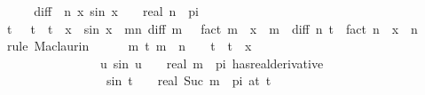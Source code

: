 \begin{isabellebody}
%
\isadelimproof
%
\endisadelimproof
%
\isatagproof
{}\isamarkupfalse%
\ {\isacharminus}{\kern0pt}\isanewline
\ \ \isamarkupfalse%
\ {\isacharquery}{\kern0pt}diff\ {\isacharequal}{\kern0pt}\ {\isachardoublequoteopen}{\isasymlambda}n\ x{\isachardot}{\kern0pt}\ sin\ {\isacharparenleft}{\kern0pt}x\ {\isacharplus}{\kern0pt}\ {}{\isacharslash}{\kern0pt}{}\ {\isacharasterisk}{\kern0pt}\ real\ n\ {\isacharasterisk}{\kern0pt}\ pi{\isacharparenright}{\kern0pt}{\isachardoublequoteclose}\isanewline
\ \ \isamarkupfalse%
\ {\isachardoublequoteopen}{\isasymexists}t{\isachardot}{\kern0pt}\ {}\ {\isacharless}{\kern0pt}\ t\ {\isasymand}\ t\ {\isacharless}{\kern0pt}\ x\ {\isasymand}\ sin\ x\ {\isacharequal}{\kern0pt}\ {\isacharparenleft}{\kern0pt}{\isasymSum}m{\isacharless}{\kern0pt}n{\isachardot}{\kern0pt}\ {\isacharquery}{\kern0pt}diff\ m\ {}\ {\isacharslash}{\kern0pt}\ {\isacharparenleft}{\kern0pt}fact\ m{\isacharparenright}{\kern0pt}\ {\isacharasterisk}{\kern0pt}\ x\ {\isacharcircum}{\kern0pt}\ m{\isacharparenright}{\kern0pt}\ {\isacharplus}{\kern0pt}\ {\isacharquery}{\kern0pt}diff\ n\ t\ {\isacharslash}{\kern0pt}\ fact\ n\ {\isacharasterisk}{\kern0pt}\ x\ {\isacharcircum}{\kern0pt}\ n{\isachardoublequoteclose}\isanewline
\ \ \isamarkupfalse%
\ {\isacharparenleft}{\kern0pt}rule\ Maclaurin{\isacharparenright}{\kern0pt}\isanewline
\ \ \ \ \isamarkupfalse%
\ {\isachardoublequoteopen}{\isasymforall}m\ t{\isachardot}{\kern0pt}\ m\ {\isacharless}{\kern0pt}\ n\ {\isasymand}\ {}\ {\isasymle}\ t\ {\isasymand}\ t\ {\isasymle}\ x\ {\isasymlongrightarrow}\isanewline
\ \ \ \ \ \ \ \ \ \ \ \ \ \ \ \ {\isacharparenleft}{\kern0pt}{\isacharparenleft}{\kern0pt}{\isasymlambda}u{\isachardot}{\kern0pt}\ sin\ {\isacharparenleft}{\kern0pt}u\ {\isacharplus}{\kern0pt}\ {}{\isacharslash}{\kern0pt}{}\ {\isacharasterisk}{\kern0pt}\ real\ m\ {\isacharasterisk}{\kern0pt}\ pi{\isacharparenright}{\kern0pt}{\isacharparenright}{\kern0pt}\ has{\isacharunderscore}{\kern0pt}real{\isacharunderscore}{\kern0pt}derivative\isanewline
\ \ \ \ \ \ \ \ \ \ \ \ \ \ \ \ \ sin\ {\isacharparenleft}{\kern0pt}t\ {\isacharplus}{\kern0pt}\ {}{\isacharslash}{\kern0pt}{}\ {\isacharasterisk}{\kern0pt}\ real\ {\isacharparenleft}{\kern0pt}Suc\ m{\isacharparenright}{\kern0pt}\ {\isacharasterisk}{\kern0pt}\ pi{\isacharparenright}{\kern0pt}{\isacharparenright}{\kern0pt}\ {\isacharparenleft}{\kern0pt}at\ t{\isacharparenright}{\kern0pt}{\isachardoublequoteclose}\isanewline

\end{isabellebody}
